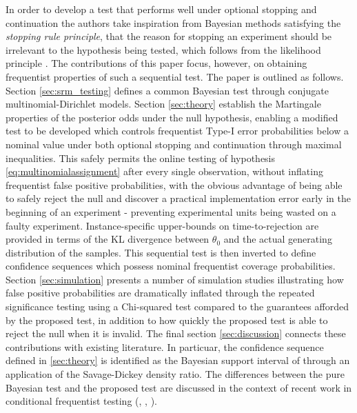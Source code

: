 \documentclass[11pt]{article}
\begin{document}
In order to develop a test that performs well under optional stopping and continuation the authors take inspiration from Bayesian methods satisfying the \textit{stopping rule principle}, that the reason for stopping an experiment should be irrelevant to the hypothesis being tested, which follows from the likelihood principle \cite{likelihood}. The contributions of this paper focus, however, on obtaining frequentist properties of such a sequential test.
The paper is outlined as follows. Section \ref{sec:srm_testing} defines a common Bayesian test through conjugate multinomial-Dirichlet models. Section \ref{sec:theory} establish the Martingale properties of the posterior odds under the null hypothesis, enabling a modified test to be developed which controls frequentist Type-I error probabilities below a nominal value under both optional stopping and continuation through maximal inequalities.  This safely permits the online testing of hypothesis \eqref{eq:multinomialassignment} after every single observation, without inflating frequentist false positive probabilities, with the obvious advantage of being able to safely reject the null and discover a practical implementation error early in the beginning of an experiment - preventing experimental units being wasted on a faulty experiment. Instance-specific upper-bounds on time-to-rejection are provided in terms of the KL divergence  between $\theta_0$ and the actual generating distribution of the samples. This sequential test is then inverted to define confidence sequences which possess nominal frequentist coverage probabilities. Section \ref{sec:simulation} presents a number of simulation studies illustrating how false positive probabilities are dramatically inflated through the repeated significance testing using a Chi-squared test compared to the guarantees afforded by the proposed test, in addition to how quickly the proposed test is able to reject the null when it is invalid. The final section \ref{sec:discussion} connects these contributions with existing literature. In particuar, the confidence sequence defined in \ref{sec:theory} is identified as the Bayesian support interval of \cite{support_interval} through an application of the Savage-Dickey density ratio. The differences between the pure Bayesian test and the proposed test are discussed in the context of recent work in conditional frequentist testing (\cite{conditional_frequentist_simple}, \cite{conditional_frequentist_precise}, \cite{conditional_frequentist_composite}).
\end{document}
